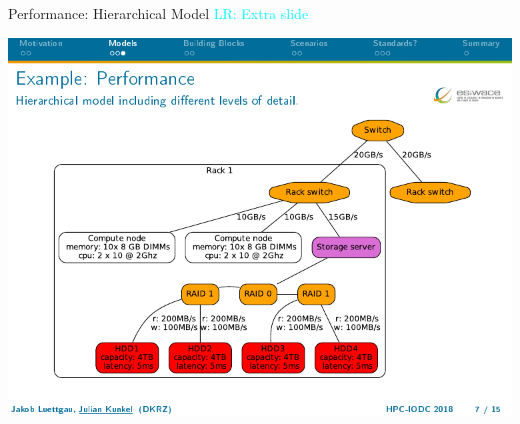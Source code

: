 \documentclass[compress,11pt,xcolor=svgnames,aspectratio=169]{beamer}
\newcommand{\lr}[1]{\textcolor{cyan}{LR: #1}}
\begin{document}
\begin{frame}[fragile]{Performance: Hierarchical Model \lr{Extra slide}}

\begin{center}
\includegraphics[scale=0.6]{fig/bottleneck3}
\end{center}

\end{frame}
\end{document}
